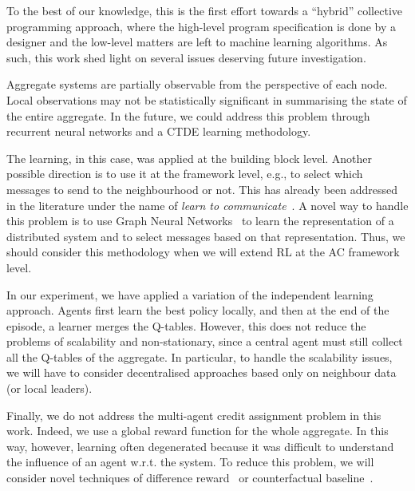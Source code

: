 \documentclass[conference]{IEEEtran}
\begin{document}
To the best of our knowledge, this is the first effort towards a ``hybrid'' collective programming approach, where the high-level program specification is 
 done by a designer and the low-level matters are left to machine learning algorithms.
%
As such, this work shed light on several issues deserving future investigation.

Aggregate systems are partially observable from the perspective of each node. 
 Local observations may not be statistically significant in summarising the state of the entire aggregate. 
 In the future, we could address this problem through recurrent neural networks and a CTDE learning methodology.
 
The learning, in this case, was applied at the building block level. 
 Another possible direction is to use it at the framework level, e.g., to select which messages to send to the neighbourhood or not. 
 This has already been addressed in the literature under the name of \textit{learn to communicate}~\cite{DBLP:journals/corr/abs-1908-03963}. 
A novel way to handle this problem is to use Graph Neural Networks~\cite{DBLP:journals/corr/abs-1812-08434} to learn the representation of a distributed system and to select messages based on that representation. 
 Thus, we should consider this methodology when we will extend RL at the AC framework level.
 
In our experiment, we have applied a variation of the independent learning approach. 
 Agents first learn the best policy locally, and then at the end of the episode, a learner merges the Q-tables. 
 However, this does not reduce the problems of scalability and non-stationary, since a central agent must still collect all the Q-tables of the aggregate. 
 In particular, to handle the scalability issues, we will have to consider decentralised approaches based only on neighbour data (or local leaders).
 
Finally, we do not address the multi-agent credit assignment problem in this work. 
 Indeed, we use a global reward function for the whole aggregate. In this way, however, learning often degenerated because it was difficult to understand the influence of an agent w.r.t. the system. 
 To reduce this problem, we will consider novel techniques of difference reward~\cite{DBLP:conf/atal/AgoginoT04} or counterfactual baseline~\cite{DBLP:journals/corr/FoersterFANW17}.



\end{document}

